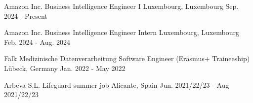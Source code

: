 

\begin{cventries}

  \cventry
    {Amazon Inc.} %
    {Business Intelligence Engineer I} %
    {Luxembourg, Luxembourg} %
    {Sep. 2024 - Present} %
    {}
    
  \cventry
    {Amazon Inc.} %
    {Business Intelligence Engineer Intern} %
    {Luxembourg, Luxembourg} %
    {Feb. 2024 - Aug. 2024} %
    {}
    
  \cventry
	{Falk Medizinische Datenverarbeitung} %
	{Software Engineer (Erasmus+ Traineeship)} %
	{Lübeck, Germany} %
	{Jan. 2022 - May 2022} %
	{}

  \cventry
	{Arbeva S.L.} %
	{Lifeguard summer job} %
	{Alicante, Spain} %
	{Jun. 2021/22/23 - Aug 2021/22/23} %
	{}
\end{cventries}
